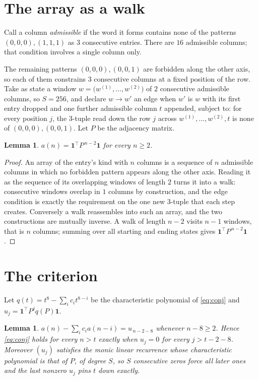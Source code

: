 \documentclass[11pt,a4paper]{article}
\theoremstyle{plain}
\newtheorem{lemma}[theorem]{Lemma}
\theoremstyle{definition}
\begin{document}
\section{The array as a walk}

Call a column \emph{admissible} if the word it forms contains none of the patterns
$(0,0,0), (1,1,1)$ as $3$ consecutive entries. There are $16$ admissible columns; that condition
involves a single column only.

The remaining patterns $(0,0,0), (0,0,1)$ are forbidden along the other axis, so each of them
constrains $3$ consecutive columns at a fixed position of the row. Take as state a
window $w=\bigl(w^{(1)},\dots,w^{(2)}\bigr)$ of $2$ consecutive admissible
columns, so $S=256$, and declare $w\to w'$ an edge when $w'$ is $w$ with its first entry
dropped and one further admissible column $t$ appended, subject to: for every position
$j$, the $3$-tuple read down the row $j$ across $w^{(1)},\dots,w^{(2)},t$
is none of $(0,0,0), (0,0,1)$. Let $P$ be the adjacency matrix.

\begin{lemma}\label{lem:walk}
$a(n)=\mathbf{1}^{\!\top}P^{\,n-2}\mathbf{1}$ for every $n\ge2$.
\end{lemma}

\begin{proof}
An array of the entry's kind with $n$ columns is a sequence of $n$ admissible columns in
which no forbidden pattern appears along the other axis. Reading it as the sequence of its
overlapping windows of length $2$ turns it into a walk: consecutive windows overlap in
$1$ columns by construction, and the edge condition is exactly the requirement on the one
new $3$-tuple that each step creates. Conversely a walk reassembles into such an array,
and the two constructions are mutually inverse. A walk of length $n-2$ visits $n-1$
windows, that is $n$ columns; summing over all starting and ending states gives
$\mathbf{1}^{\!\top}P^{\,n-2}\mathbf{1}$.
\end{proof}

\section{The criterion}

Let $q(t)=t^{8}-\sum_i c_i t^{8-i}$ be the characteristic polynomial of
\eqref{eq:conj} and $u_j=\mathbf{1}^{\!\top}P^{j}q(P)\mathbf{1}$.

\begin{lemma}\label{lem:crit}
$a(n)-\sum_i c_i a(n-i)=u_{\,n-2-8}$ whenever $n-8\ge2$. Hence
\eqref{eq:conj} holds for every $n>t$ exactly when $u_j=0$ for every
$j>t-2-8$. Moreover $(u_j)$ satisfies the monic linear recurrence whose
characteristic polynomial is that of $P$, of degree $S$, so $S$ consecutive zeros force all
later ones and the last nonzero $u_j$ pins $t$ down exactly.
\end{lemma}
\end{document}
